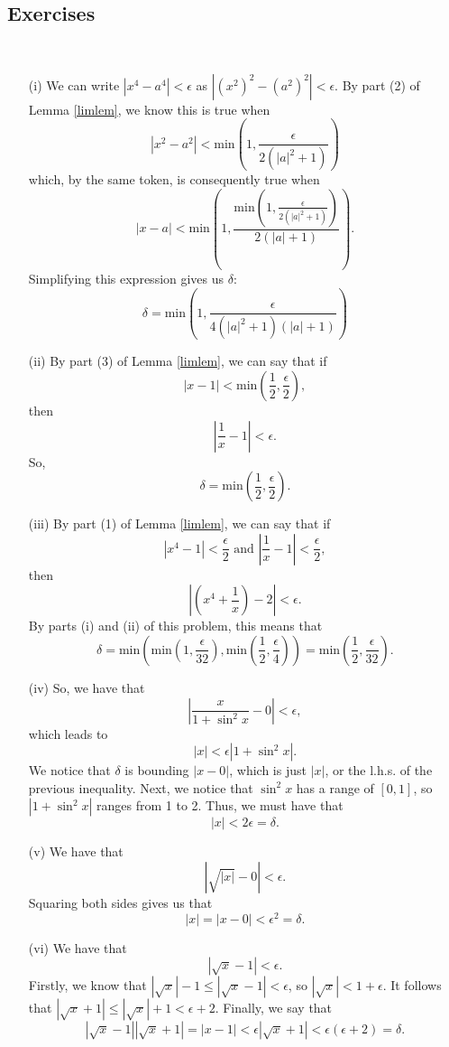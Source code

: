 \subsection{Exercises}
\begin{problem}[5-3] \ 
\begin{enumerate}
\item[(i)]
We can write $|x^4 - a^4| < \epsilon$ as $|(x^2)^2 - (a^2)^2| < \epsilon$. By part (2) of Lemma \ref{limlem}, we know this is true when
\[ |x^2 - a^2| < \textrm{min}\left(1, \frac{\epsilon}{2(|a|^2 + 1)}\right) \]
which, by the same token, is consequently true when
\[ |x - a| < \textrm{min}\left(1, \frac{\textrm{min}\left(1, \frac{\epsilon}{2(|a|^2 + 1)}\right)}{2(|a| + 1)}\right). \]
Simplifying this expression gives us $\delta$:
\[ \delta = \textrm{min}\left(1, \frac{\epsilon}{4(|a|^2 + 1)(|a| + 1)}\right) \]

\item[(ii)]
By part (3) of Lemma \ref{limlem}, we can say that if
\[ |x - 1| < \textrm{min}\left(\frac{1}{2}, \frac{\epsilon}{2}\right), \]
then
\[ \left|\frac{1}{x} - 1\right| < \epsilon. \]
So, 
\[ \delta = \textrm{min}\left(\frac{1}{2}, \frac{\epsilon}{2}\right). \]

\item[(iii)]
By part (1) of Lemma \ref{limlem}, we can say that if
\[ |x^4 - 1| < \frac{\epsilon}{2} \textrm{ and } \left|\frac{1}{x} - 1\right| < \frac{\epsilon}{2}, \]
then
\[ \left|(x^4 + \frac{1}{x}) - 2\right| < \epsilon. \]
By parts (i) and (ii) of this problem, this means that 
\[ \delta = \textrm{min}\left(\textrm{min}\left(1, \frac{\epsilon}{32}\right), \textrm{min}\left(\frac{1}{2}, \frac{\epsilon}{4}\right)\right) = \textrm{min}\left(\frac{1}{2}, \frac{\epsilon}{32}\right). \]

\item[(iv)]
So, we have that
\[ \left|\frac{x}{1 + \sin^2 x} - 0\right| < \epsilon, \]
which leads to
\[ |x| < \epsilon|1 + \sin^2 x|. \]
We notice that $\delta$ is bounding $|x - 0|$, which is just $|x|$, or the l.h.s. of the previous inequality. Next, we notice that $\sin^2 x$ has a range of $[0, 1]$, so $|1 + \sin^2 x|$ ranges from 1 to 2. Thus, we must have that 
\[ |x| < 2\epsilon = \delta. \]

\item[(v)]
We have that
\[ |\sqrt{|x|} - 0| < \epsilon. \]
Squaring both sides gives us that
\[ |x| = |x - 0| < \epsilon^2 = \delta. \]

\item[(vi)]
We have that
\[ |\sqrt{x} - 1| < \epsilon. \]
Firstly, we know that $|\sqrt{x}| - 1 \le |\sqrt{x} - 1| < \epsilon$, so $|\sqrt{x}| < 1 + \epsilon.$ It follows that $|\sqrt{x} + 1| \le |\sqrt{x}| + 1 < \epsilon + 2$. Finally, we say that
\[ |\sqrt{x} - 1||\sqrt{x} + 1| = |x - 1| < \epsilon|\sqrt{x} + 1| < \epsilon(\epsilon + 2) = \delta. \]

\end{enumerate}
\end{problem}

